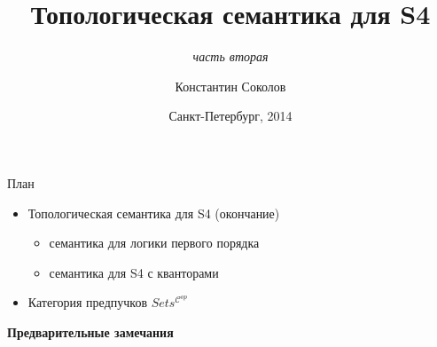 \documentclass{beamer}
\begin{document}
\title{\Large{Топологическая семантика для S4}}
\subtitle{\textit{часть вторая}}
\author{Константин Соколов}
\date{Санкт-Петербург, 2014} 
\begin{frame}
    \thispagestyle{empty}
    \titlepage
\end{frame}

\begin{frame}{План}
    \setcounter{framenumber}{1}
    \begin{itemize}
        \item Топологическая семантика для S4 (окончание)
        	\begin{itemize}
				\item семантика для логики первого порядка
				\item семантика для S4 с кванторами
        	\end{itemize}
		\item Категория предпучков $Sets^{\mathcal{C}^{op}}$
    \end{itemize}
\end{frame}






\begin{frame}{}
\begin{center}
	\textbf{Предварительные замечания}
\end{center}
\end{frame}
\end{document}
